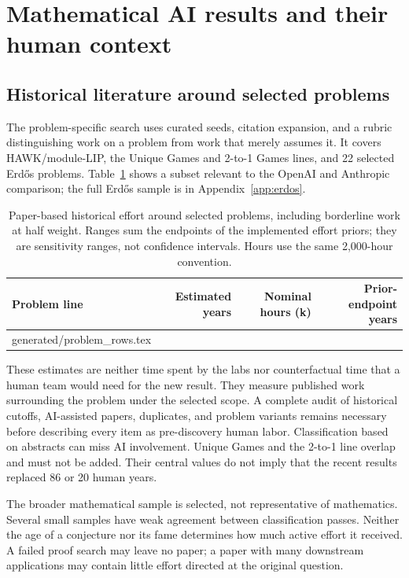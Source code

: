 \documentclass[11pt,letterpaper]{article}
\makeatletter
\let\inputrows\@@input
\makeatother
\begin{document}
\section{Mathematical AI results and their human context}
\subsection{Historical literature around selected problems}
The problem-specific search uses curated seeds, citation expansion, and a rubric distinguishing work on a problem from work that merely assumes it. It covers HAWK/module-LIP, the Unique Games and 2-to-1 Games lines, and 22 selected Erd\H{o}s problems. Table~\ref{tab:problems} shows a subset relevant to the OpenAI and Anthropic comparison; the full Erd\H{o}s sample is in Appendix~\ref{app:erdos}.

\begin{table}[htbp]
\centering\small
\caption{Paper-based historical effort around selected problems, including borderline work at half weight. Ranges sum the endpoints of the implemented effort priors; they are sensitivity ranges, not confidence intervals. Hours use the same 2,000-hour convention.}
\label{tab:problems}
\begin{tabular}{lrrr}\toprule
Problem line & Estimated years & Nominal hours (k) & Prior-endpoint years\\\midrule
\inputrows generated/problem_rows.tex
\bottomrule\end{tabular}
\end{table}

These estimates are neither time spent by the labs nor counterfactual time that a human team would need for the new result. They measure published work surrounding the problem under the selected scope. A complete audit of historical cutoffs, AI-assisted papers, duplicates, and problem variants remains necessary before describing every item as pre-discovery human labor. Classification based on abstracts can miss AI involvement. Unique Games and the 2-to-1 line overlap and must not be added. Their central values do not imply that the recent results replaced 86 or 20 human years.

The broader mathematical sample is selected, not representative of mathematics. Several small samples have weak agreement between classification passes. Neither the age of a conjecture nor its fame determines how much active effort it received. A failed proof search may leave no paper; a paper with many downstream applications may contain little effort directed at the original question.
\end{document}
